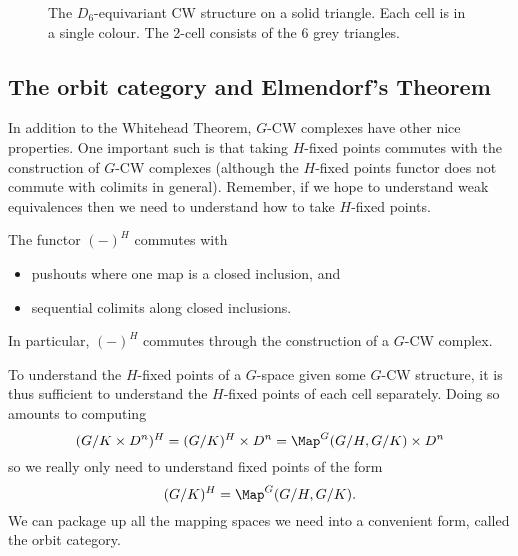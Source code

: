 \begin{figure}
    \centering
    \caption{The $D_6$-equivariant CW structure on a solid triangle. Each cell is in a single colour. The 2-cell consists of the 6 grey triangles.}
    \label{fig: triangle example}
\end{figure}

\subsection{The orbit category and Elmendorf's Theorem}

In addition to the Whitehead Theorem, $G$-CW complexes have other nice properties. One important such is that taking $H$-fixed points commutes with the construction of $G$-CW complexes (although the $H$-fixed points functor does not commute with colimits in general). Remember, if we hope to understand weak equivalences then we need to understand how to take $H$-fixed points.

\begin{prop} The functor $(-)^H$ commutes with 
    \begin{itemize}
        \item pushouts where one map is a closed inclusion, and
        \item sequential colimits along closed inclusions.
    \end{itemize}
    In particular, $(-)^H$ commutes through the construction of a $G$-CW complex. 
\end{prop}

To understand the $H$-fixed points of a $G$-space given some $G$-CW structure, it is thus sufficient to understand the $H$-fixed points of each cell separately. Doing so amounts to computing 
\[(G/K \times D^n)^H = (G/K)^H \times D^n = \Map^G(G/H, G/K) \times D^n\]
so we really only need to understand fixed points of the form 
\[(G/K)^H = \Map^G(G/H, G/K).\] 
We can package up all the mapping spaces we need into a convenient form, called the orbit category.

